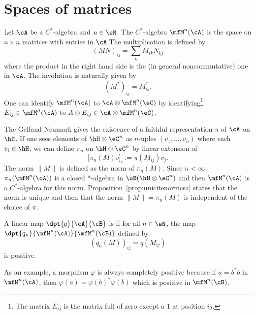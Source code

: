%
\section{Spaces of matrices}
%

Let $\cA$ be a $C^*$-algebra and $n\in\eN$. The $C^*$-algebra $\mfM^n(\cA)$ is the space on $n\times n$ matrices with entries in $\cA$.The multiplication is defined by
\begin{equation}
	(MN)_{ij}=\sum_kM_{ik}N_{kj}
\end{equation}
where the product in the right hand side is the (in general noncommutative) one in $\cA$. The involution is naturally given by
\begin{equation}
	(M^*)_{ij}=M_{ij}^*.
\end{equation}
One can identify $\mfM^n(\cA)$ to $\cA\otimes\mfM^n(\eC)$ by identifying\footnote{The matrix $E_{ij}$ is the matrix full of zero except a $1$ at position $ij$.} $E_{ij}\in\mfM^n(\cA)$ to $A\otimes E_{ij}\in\cA\otimes\mfM^n(\eC)$.

The Gelfand-Neumark gives the existence of a faithful representation $\pi$ of $\cA$ on $\hH$. If one sees elements of $\hH\otimes\eC^n$ as $n$-uples $(v_1,\ldots,v_n)$ where each $v_i\in\hH$, we can define $\pi_n$ on $\hH\otimes\eC^n$ by linear extension of
\begin{equation} \label{eq:defreprezmfM}
	\big[\pi_n(M)v\big]_i:=\pi(M_{ij})v_j.
\end{equation}
The norm $\| M \|$ is defined as the norm of $\pi_n(M)$. Since $n<\infty$, $\pi_n(\mfM^n(\cA))$ is a closed $*$-algebra in $\oB(\hH\otimes\eC^n)$ and then $\mfM^n(\cA)$ is a $C^*$-algebra for this norm. Proposition~\ref{prop:unicitenormcsa} states that the norm is unique and then that the norm $\| M \|=\pi_n(M)$ is independent of the choice of $\pi$.

\begin{definition}      \label{DefComplPositive}
	A linear map $\dpt{ q }{ \cA }{ \cB }$ is  if for all $n\in\eN$, the map $\dpt{ q_n }{ \mfM^n(\cA) }{ \mfM^n(\cB) }$ defined by
	\[
		(q_n(M))_{ij}=q(M_{ij})
	\]
	is positive.
\end{definition}
As an example, a morphism $\varphi$ is always completely positive because if $a=b^*b$ in $\mfM^n(\cA)$, then $\varphi(a)=\varphi(b)^*\varphi(b)$ which is positive in $\mfM^n(\cB)$.

